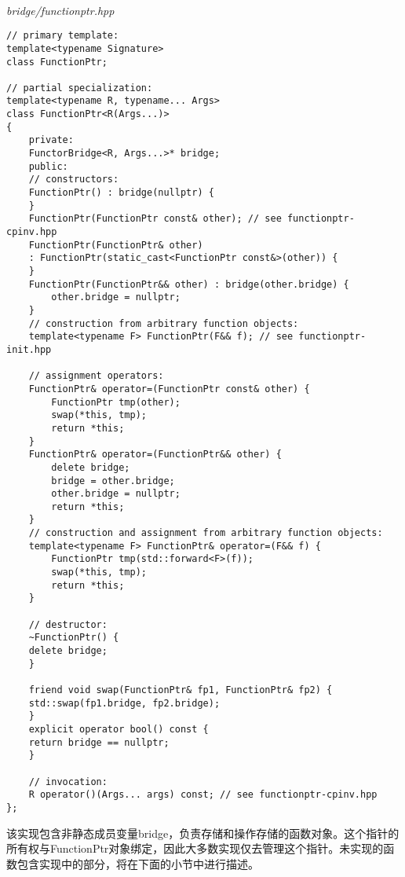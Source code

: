\hspace*{\fill} \\ %
\noindent
\textit{bridge/functionptr.hpp}
\begin{lstlisting}[style=styleCXX]
// primary template:
template<typename Signature>
class FunctionPtr;

// partial specialization:
template<typename R, typename... Args>
class FunctionPtr<R(Args...)>
{
	private:
	FunctorBridge<R, Args...>* bridge;
	public:
	// constructors:
	FunctionPtr() : bridge(nullptr) {
	}
	FunctionPtr(FunctionPtr const& other); // see functionptr-cpinv.hpp
	FunctionPtr(FunctionPtr& other)
	: FunctionPtr(static_cast<FunctionPtr const&>(other)) {
	}
	FunctionPtr(FunctionPtr&& other) : bridge(other.bridge) {
		other.bridge = nullptr;
	}
	// construction from arbitrary function objects:
	template<typename F> FunctionPtr(F&& f); // see functionptr-init.hpp
	
	// assignment operators:
	FunctionPtr& operator=(FunctionPtr const& other) {
		FunctionPtr tmp(other);
		swap(*this, tmp);
		return *this;
	}
	FunctionPtr& operator=(FunctionPtr&& other) {
		delete bridge;
		bridge = other.bridge;
		other.bridge = nullptr;
		return *this;
	}
	// construction and assignment from arbitrary function objects:
	template<typename F> FunctionPtr& operator=(F&& f) {
		FunctionPtr tmp(std::forward<F>(f));
		swap(*this, tmp);
		return *this;
	}

	// destructor:
	~FunctionPtr() {
	delete bridge;
	}

	friend void swap(FunctionPtr& fp1, FunctionPtr& fp2) {
	std::swap(fp1.bridge, fp2.bridge);
	}
	explicit operator bool() const {
	return bridge == nullptr;
	}

	// invocation:
	R operator()(Args... args) const; // see functionptr-cpinv.hpp
};
\end{lstlisting}

该实现包含非静态成员变量bridge，负责存储和操作存储的函数对象。这个指针的所有权与FunctionPtr对象绑定，因此大多数实现仅去管理这个指针。未实现的函数包含实现中的部分，将在下面的小节中进行描述。






































